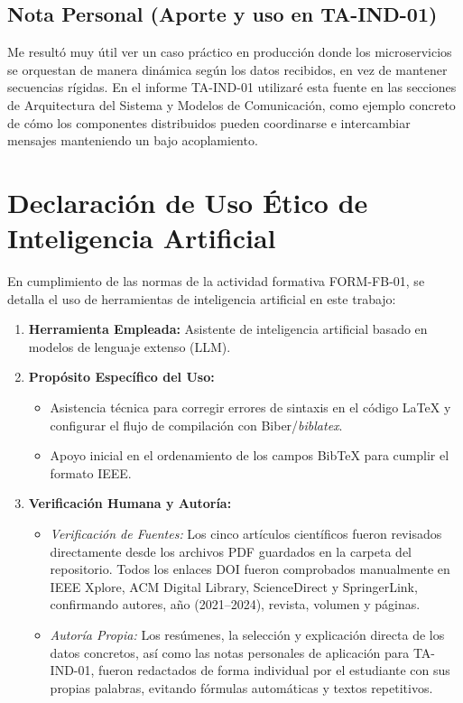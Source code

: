 \documentclass[11pt,a4paper]{article}
\begin{document}
\subsection*{Nota Personal (Aporte y uso en TA-IND-01)}
Me resultó muy útil ver un caso práctico en producción donde los microservicios se orquestan de manera dinámica según los datos recibidos, en vez de mantener secuencias rígidas. En el informe TA-IND-01 utilizaré esta fuente en las secciones de Arquitectura del Sistema y Modelos de Comunicación, como ejemplo concreto de cómo los componentes distribuidos pueden coordinarse e intercambiar mensajes manteniendo un bajo acoplamiento.

\newpage

\section{Declaración de Uso Ético de Inteligencia Artificial}

En cumplimiento de las normas de la actividad formativa FORM-FB-01, se detalla el uso de herramientas de inteligencia artificial en este trabajo:

\begin{enumerate}[leftmargin=1.3em]
    \item \textbf{Herramienta Empleada:} Asistente de inteligencia artificial basado en modelos de lenguaje extenso (LLM).
    \item \textbf{Propósito Específico del Uso:}
    \begin{itemize}
        \item Asistencia técnica para corregir errores de sintaxis en el código LaTeX y configurar el flujo de compilación con Biber/\emph{biblatex}.
        \item Apoyo inicial en el ordenamiento de los campos BibTeX para cumplir el formato IEEE.
    \end{itemize}
    \item \textbf{Verificación Humana y Autoría:}
    \begin{itemize}
        \item \emph{Verificación de Fuentes:} Los cinco artículos científicos fueron revisados directamente desde los archivos PDF guardados en la carpeta del repositorio. Todos los enlaces DOI fueron comprobados manualmente en IEEE Xplore, ACM Digital Library, ScienceDirect y SpringerLink, confirmando autores, año (2021--2024), revista, volumen y páginas.
        \item \emph{Autoría Propia:} Los resúmenes, la selección y explicación directa de los datos concretos, así como las notas personales de aplicación para TA-IND-01, fueron redactados de forma individual por el estudiante con sus propias palabras, evitando fórmulas automáticas y textos repetitivos.
    \end{itemize}
\end{enumerate}

\vspace{1em}

\printbibliography[title={Referencias Bibliográficas (Formato IEEE)}]
\end{document}
